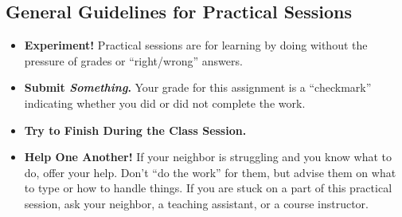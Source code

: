 \subsection*{General Guidelines for Practical Sessions}
\begin{itemize}

\item {\bf Experiment!} Practical sessions are for learning by doing without the pressure of grades or ``right/wrong''
  answers.

\item {\bf Submit \textbf{\textit{Something}}.} Your grade for this assignment is a ``checkmark'' indicating whether you
  did or did not complete the work.

\item {\bf Try to Finish During the Class Session.} 

\item {\bf Help One Another!} If your neighbor is struggling and you know what to do, offer your help. Don't ``do the work'' for them, but advise them on what to type or how to handle things. If you are stuck on a part of this practical session, ask your neighbor, a teaching assistant, or a course instructor.
\end{itemize}


